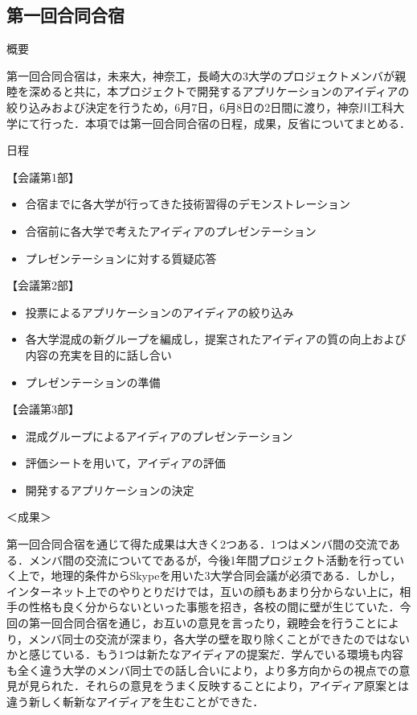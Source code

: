 \subsection{第一回合同合宿}
\par
概要
\par 
第一回合同合宿は，未来大，神奈工，長崎大の3大学のプロジェクトメンバが親睦を深めると共に，本プロジェクトで開発するアプリケーションのアイディアの絞り込みおよび決定を行うため，6月7日，6月8日の2日間に渡り，神奈川工科大学にて行った．本項では第一回合同合宿の日程，成果，反省についてまとめる．
\par
日程
\par
【会議第1部】
\begin{itemize}
\item 合宿までに各大学が行ってきた技術習得のデモンストレーション
\item 合宿前に各大学で考えたアイディアのプレゼンテーション
\item プレゼンテーションに対する質疑応答
\end{itemize}
【会議第2部】
\begin{itemize}
\item 投票によるアプリケーションのアイディアの絞り込み
\item 各大学混成の新グループを編成し，提案されたアイディアの質の向上および内容の充実を目的に話し合い
\item プレゼンテーションの準備
\end{itemize}
【会議第3部】
\begin{itemize}
\item 混成グループによるアイディアのプレゼンテーション
\item 評価シートを用いて，アイディアの評価
\item 開発するアプリケーションの決定
\end{itemize}
＜成果＞
\par  第一回合同合宿を通じて得た成果は大きく2つある．1つはメンバ間の交流である．メンバ間の交流についてであるが，今後1年間プロジェクト活動を行っていく上で，地理的条件からSkypeを用いた3大学合同会議が必須である．しかし，インターネット上でのやりとりだけでは，互いの顔もあまり分からない上に，相手の性格も良く分からないといった事態を招き，各校の間に壁が生じていた．今回の第一回合同合宿を通じ，お互いの意見を言ったり，親睦会を行うことにより，メンバ同士の交流が深まり，各大学の壁を取り除くことができたのではないかと感じている．もう1つは新たなアイディアの提案だ．学んでいる環境も内容も全く違う大学のメンバ同士での話し合いにより，より多方向からの視点での意見が見られた．それらの意見をうまく反映することにより，アイディア原案とは違う新しく斬新なアイディアを生むことができた．
